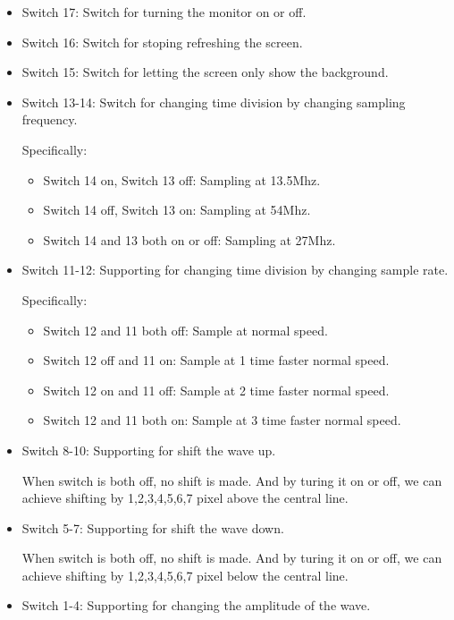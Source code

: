 \documentclass[11pt]{scrartcl}
\begin{document}
\begin{itemize}
    \item Switch 17:
    Switch for turning the monitor on or off.
    \item Switch 16:
    Switch for stoping refreshing the screen.
    \item Switch 15:
    Switch for letting the screen only show the background.
    \item Switch 13-14:
    Switch for changing time division by changing sampling frequency.
    
    Specifically:
    \begin{itemize}
        \item Switch 14 on, Switch 13 off:
        Sampling at 13.5Mhz.
        \item Switch 14 off, Switch 13 on:
        Sampling at 54Mhz.
        \item Switch 14 and 13 both on or off:
        Sampling at 27Mhz.        
    \end{itemize}
    \item Switch 11-12:
    Supporting for changing time division by changing sample rate.
    
    Specifically:
    \begin{itemize}
        \item Switch 12 and 11 both off:
        Sample at normal speed.
        \item Switch 12 off and 11 on:
        Sample at 1 time faster normal speed.
        \item Switch 12 on and 11 off:
        Sample at 2 time faster normal speed.
        \item Switch 12 and 11 both on:
        Sample at 3 time faster normal speed.
    \end{itemize}
    \item Switch 8-10:
    Supporting for shift the wave up.
    
    When switch is both off, no shift is made. And by turing it on or off, we can achieve shifting by 1,2,3,4,5,6,7 pixel above the central line.
    \item Switch 5-7:
    Supporting for shift the wave down.
    
    When switch is both off, no shift is made. And by turing it on or off, we can achieve shifting by 1,2,3,4,5,6,7 pixel below the central line.
    \item Switch 1-4:
    Supporting for changing the amplitude of the wave.
    

\end{itemize}
\end{document}
